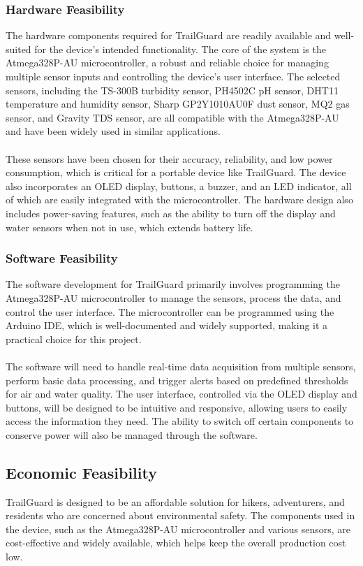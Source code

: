 \documentclass[a4paper,11pt]{article}%
\begin{document}
\subsubsection{Hardware Feasibility} 
The hardware components required for TrailGuard are readily available and well-suited for the device's intended functionality. The core of the system is the Atmega328P-AU microcontroller, a robust and reliable choice for managing multiple sensor inputs and controlling the device’s user interface. The selected sensors, including the TS-300B turbidity sensor, PH4502C pH sensor, DHT11 temperature and humidity sensor, Sharp GP2Y1010AU0F dust sensor, MQ2 gas sensor, and Gravity TDS sensor, are all compatible with the Atmega328P-AU and have been widely used in similar applications.
\\
\\
These sensors have been chosen for their accuracy, reliability, and low power consumption, which is critical for a portable device like TrailGuard. The device also incorporates an OLED display, buttons, a buzzer, and an LED indicator, all of which are easily integrated with the microcontroller. The hardware design also includes power-saving features, such as the ability to turn off the display and water sensors when not in use, which extends battery life. 
\subsubsection{Software Feasibility}
The software development for TrailGuard primarily involves programming the Atmega328P-AU microcontroller to manage the sensors, process the data, and control the user interface. The microcontroller can be programmed using the Arduino IDE, which is well-documented and widely supported, making it a practical choice for this project.
\\
\\
The software will need to handle real-time data acquisition from multiple sensors, perform basic data processing, and trigger alerts based on predefined thresholds for air and water quality. The user interface, controlled via the OLED display and buttons, will be designed to be intuitive and responsive, allowing users to easily access the information they need. The ability to switch off certain components to conserve power will also be managed through the software. 
\subsection{Economic Feasibility}
TrailGuard is designed to be an affordable solution for hikers, adventurers, and residents who are concerned about environmental safety. The components used in the device, such as the Atmega328P-AU microcontroller and various sensors, are cost-effective and widely available, which helps keep the overall production cost low.
\end{document}

